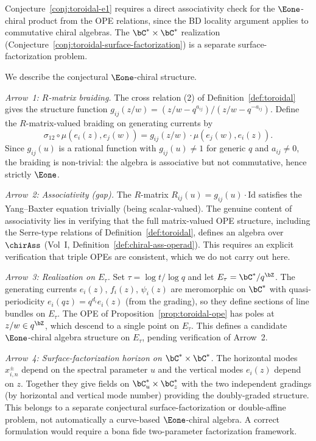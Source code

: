 \begin{remark}[Scope]
Conjecture~\ref{conj:toroidal-e1} requires a direct associativity check for the $\Eone$-chiral product from the OPE relations, since the BD locality argument applies to commutative chiral algebras. The $\bC^* \times \bC^*$ realization (Conjecture~\ref{conj:toroidal-surface-factorization}) is a separate surface-factorization problem.
\end{remark}

\begin{remark}[Evidence]
We describe the conjectural $\Eone$-chiral structure.

\emph{Arrow~1: $R$-matrix braiding.}
The cross relation (2) of Definition~\ref{def:toroidal} gives the
structure function $g_{ij}(z/w) = (z/w - q^{a_{ij}})/(z/w - q^{-a_{ij}})$.
Define the $R$-matrix-valued braiding on generating currents by
\[
\sigma_{12} \circ \mu(e_i(z), e_j(w))
= g_{ij}(z/w) \cdot \mu(e_j(w), e_i(z)).
\]
Since $g_{ij}(u)$ is a rational function with $g_{ij}(u) \neq 1$
for generic $q$ and $a_{ij} \neq 0$, the braiding is non-trivial:
the algebra is associative but not commutative, hence strictly $\Eone$.

\emph{Arrow~2: Associativity (gap).}
The $R$-matrix $R_{ij}(u) = g_{ij}(u) \cdot \mathrm{Id}$ satisfies
the Yang--Baxter equation trivially (being scalar-valued).
The genuine content of associativity lies in verifying that the
full matrix-valued OPE structure, including the Serre-type relations
of Definition~\ref{def:toroidal}, defines an algebra over $\chirAss$
(Vol~I, Definition~\ref{def:chiral-ass-operad}). This requires an explicit
verification that triple OPEs are consistent, which we do not
carry out here.

\emph{Arrow~3: Realization on $E_\tau$.}
Set $\tau = \log t / \log q$ and let $E_\tau = \bC^*/q^{\bZ}$.
The generating currents $e_i(z)$, $f_i(z)$, $\psi_i(z)$ are meromorphic
on $\bC^*$ with quasi-periodicity $e_i(qz) = q^{d_i} e_i(z)$
(from the grading), so they define sections of line bundles on $E_\tau$.
The OPE of Proposition~\ref{prop:toroidal-ope} has poles at
$z/w \in q^{\bZ}$, which descend to a single point on $E_\tau$.
This defines a candidate $\Eone$-chiral algebra structure on $E_\tau$,
pending verification of Arrow~2.

\emph{Arrow~4: Surface-factorization horizon on $\bC^* \times \bC^*$.}
The horizontal modes $x^\pm_{i,n}$ depend on the spectral
parameter $u$ and the vertical modes $e_i(z)$ depend on $z$.
Together they give fields on $\bC^*_u \times \bC^*_z$ with the
two independent gradings (by horizontal and vertical mode number)
providing the doubly-graded structure. This belongs to a separate
conjectural surface-factorization or double-affine problem, not
automatically a
curve-based $\Eone$-chiral algebra. A correct formulation would
require a bona fide two-parameter factorization framework.


\end{remark}
